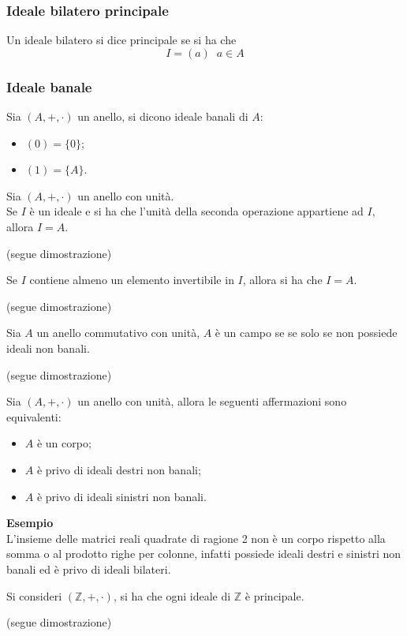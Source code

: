 \begin{flushleft}
\subsubsection{Ideale bilatero principale}
Un ideale bilatero si dice principale se si ha che
\[
    I = (a)\;\;a\in A
\]

\subsubsection{Ideale banale}
Sia $(A, +, \cdot)$ un anello, si dicono ideale banali di $A$:
\begin{itemize}
    \item $(0) = \{0\}$;
    \item $(1) = \{A\}$.
\end{itemize}
\begin{proprieta}
Sia $(A, +, \cdot)$ un anello con unità.\\
Se $I$ è un ideale e si ha che l'unità della seconda operazione appartiene ad $I$, allora $I = A$.
\end{proprieta}
(segue dimostrazione)
\\ \vspace{300px}

\begin{proprieta}
Se $I$ contiene almeno un elemento invertibile in $I$, allora si ha che $I=A$.
\end{proprieta}
(segue dimostrazione)
\\ \vspace{300px}

\begin{proprieta}
Sia $A$ un anello commutativo con unità, $A$ è un campo se se solo se non possiede ideali non banali.
\end{proprieta}
(segue dimostrazione)
\\ \vspace{300px}
\begin{proprieta}
Sia $(A, +, \cdot)$ un anello con unità, allora le seguenti affermazioni sono equivalenti:
\end{proprieta}
\begin{itemize}
    \item $A$ è un corpo;
    \item $A$ è privo di ideali destri non banali;
    \item $A$ è privo di ideali sinistri non banali.
\end{itemize}
\textbf{Esempio}\\
L'insieme delle matrici reali quadrate di ragione 2 non è un corpo rispetto alla somma o al prodotto righe per colonne, infatti possiede ideali destri e sinistri non banali ed è privo di ideali bilateri.
\begin{proprieta}
Si consideri $(\mathbb{Z}, +, \cdot)$, si ha che ogni ideale di $\mathbb{Z}$ è principale.
\end{proprieta}
(segue dimostrazione)
\\ \vspace{300px}
 

\end{flushleft}
